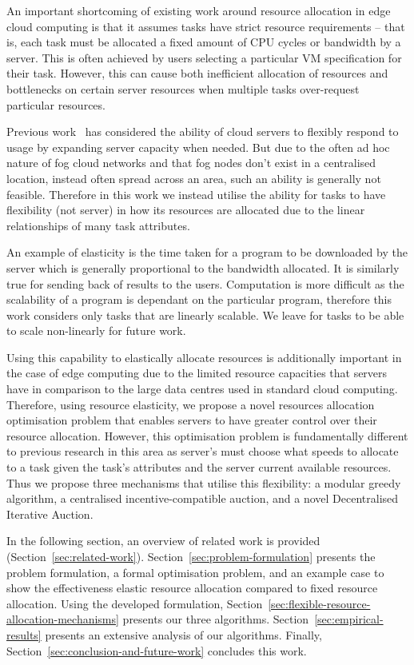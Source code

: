 An important shortcoming of existing work around resource allocation in edge cloud computing is that it assumes tasks
have strict resource requirements -- that is, each task must be allocated a fixed amount of CPU cycles or bandwidth by a
server. This is often achieved by users selecting a particular VM specification for their task. However, this can cause
both inefficient allocation of resources and bottlenecks on certain server resources when multiple tasks over-request
particular resources.

Previous work~\cite{ServerElasticity} has considered the ability of cloud servers to flexibly respond to usage by
expanding server capacity when needed. But due to the often ad hoc nature of fog cloud networks and that fog nodes don't
exist in a centralised location, instead often spread across an area, such an ability is generally not feasible. Therefore in
this work we instead utilise the ability for tasks to have flexibility (not server) in how its resources are allocated
due to the linear relationships of many task attributes.

An example of elasticity is the time taken for a program to be downloaded by the server which is generally proportional
to the bandwidth allocated. It is similarly true for sending back of results to the users. Computation is more
difficult as the scalability of a program is dependant on the particular program, therefore this
work considers only tasks that are linearly scalable. We leave for tasks to be able to scale non-linearly for future
work.

Using this capability to elastically allocate resources is additionally important in the case of edge computing due to
the limited resource capacities that servers have in comparison to the large data centres used in standard cloud
computing. Therefore, using resource elasticity, we propose a novel resources allocation optimisation problem that
enables servers to have greater control over their resource allocation. However, this optimisation problem is
fundamentally different to previous research in this area as server's must choose what speeds to allocate to a task
given the task's attributes and the server current available resources. Thus we propose three mechanisms that utilise
this flexibility: a modular greedy algorithm, a centralised incentive-compatible auction, and a novel Decentralised
Iterative Auction.

In the following section, an overview of related work is provided (Section~\ref{sec:related-work}).
Section~\ref{sec:problem-formulation} presents the problem formulation, a formal optimisation problem, and an example
case to show the effectiveness elastic resource allocation compared to fixed resource allocation. Using the developed
formulation, Section~\ref{sec:flexible-resource-allocation-mechanisms} presents our three algorithms.
Section~\ref{sec:empirical-results} presents an extensive analysis of our algorithms. Finally,
Section~\ref{sec:conclusion-and-future-work} concludes this work.
